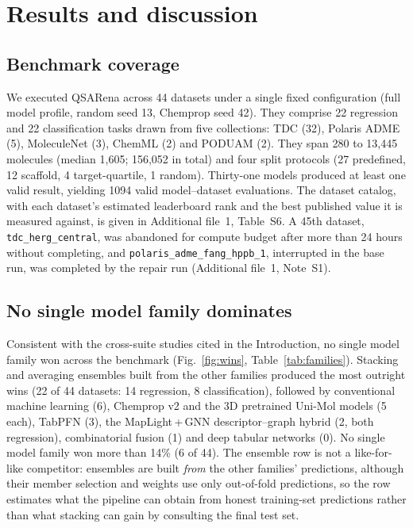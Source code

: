 \section{Results and discussion}\label{sec:results}

\subsection{Benchmark coverage}\label{sec:coverage}

We executed QSARena across 44 datasets under a single fixed configuration (full model profile, random seed 13, Chemprop seed 42). They comprise 22 regression and 22 classification tasks drawn from five collections: TDC (32), Polaris ADME (5), MoleculeNet (3), ChemML (2) and PODUAM (2). They span 280 to 13,445 molecules (median 1,605; 156,052 in total) and four split protocols (27 predefined, 12 scaffold, 4 target-quartile, 1 random). Thirty-one models produced at least one valid result, yielding 1094 valid model--dataset evaluations. The dataset catalog, with each dataset's estimated leaderboard rank and the best published value it is measured against, is given in Additional file~1, Table~S6. A 45th dataset, \texttt{tdc\_herg\_central}, was abandoned for compute budget after more than 24 hours without completing, and \texttt{polaris\_adme\_fang\_hppb\_1}, interrupted in the base run, was completed by the repair run (Additional file~1, Note~S1).

\subsection{No single model family dominates}\label{sec:nowinner}

Consistent with the cross-suite studies cited in the Introduction, no single model family won across the benchmark (Fig.~\ref{fig:wins}, Table~\ref{tab:families}). Stacking and averaging ensembles built from the other families produced the most outright wins (22 of 44 datasets: 14 regression, 8 classification), followed by conventional machine learning (6), Chemprop v2 and the 3D pretrained Uni-Mol models (5 each), TabPFN (3), the MapLight\,+\,GNN descriptor--graph hybrid (2, both regression), combinatorial fusion (1) and deep tabular networks (0). No single model family won more than 14\% (6 of 44). The ensemble row is not a like-for-like competitor: ensembles are built \emph{from} the other families' predictions, although their member selection and weights use only out-of-fold predictions, so the row estimates what the pipeline can obtain from honest training-set predictions rather than what stacking can gain by consulting the final test set.

